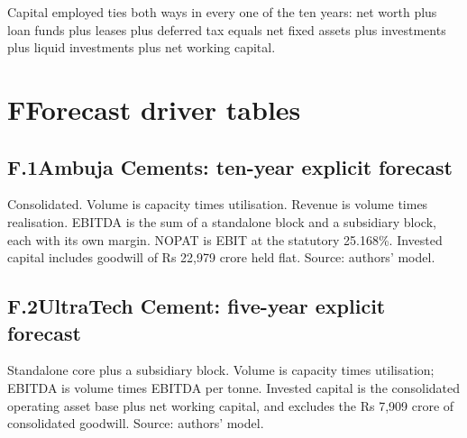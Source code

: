 \vspace{1mm}
{\scriptsize\color{ash}Capital employed ties both ways in every one of the ten years:
net worth plus loan funds plus leases plus deferred tax equals net fixed assets plus
investments plus liquid investments plus net working capital.\par}
\clearpage

\section*{F\quad Forecast driver tables}

\subsection*{F.1\quad Ambuja Cements: ten-year explicit forecast}
\vspace{1mm}
{\scriptsize\ambforecast\par}
\vspace{1mm}
{\scriptsize\color{ash}Consolidated. Volume is capacity times utilisation. Revenue is
volume times realisation. EBITDA is the sum of a standalone block and a subsidiary
block, each with its own margin. NOPAT is EBIT at the statutory 25.168\%. Invested
capital includes goodwill of Rs 22,979 crore held flat. Source: authors' model.\par}

\vspace{5mm}
\subsection*{F.2\quad UltraTech Cement: five-year explicit forecast}
\vspace{1mm}
{\footnotesize\utclforecast\par}
\vspace{1mm}
{\scriptsize\color{ash}Standalone core plus a subsidiary block. Volume is capacity
times utilisation; EBITDA is volume times EBITDA per tonne. Invested capital is the
consolidated operating asset base plus net working capital, and excludes the Rs 7,909
crore of consolidated goodwill. Source: authors' model.\par}

\vspace{5mm}
